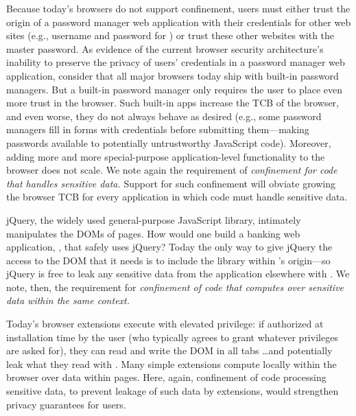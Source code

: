 %
%
Because today's browsers do not support confinement, users must either
trust the origin of a password manager web application with their
credentials for other web sites (e.g., username and password for
) or trust these other websites with the master
password.
%
As evidence of the current browser security architecture's inability
to preserve the privacy of users' credentials in a password manager
web application, consider that all major browsers today ship with
built-in password managers.
%
But a built-in password manager only requires the user to place even
more trust in the browser.
%
Such built-in apps increase the TCB of the browser, and even worse,
they do not always behave as desired (e.g., some password managers
fill in forms with credentials before submitting them---making
passwords available to potentially untrustworthy JavaScript code).
%
Moreover, adding more and more special-purpose application-level
functionality to the browser does not scale. We note again the
requirement of {\em confinement for code that handles sensitive data.}
Support for such confinement will obviate growing the browser TCB for
every application in which code must handle sensitive data.


jQuery, the widely used general-purpose JavaScript library, intimately
manipulates the DOMs of pages. How would one build a banking web
application, , that safely uses jQuery? Today the only
way to give jQuery the access to the DOM that it needs is to include
the library within 's origin---so jQuery is free to
leak any sensitive data from the application elsewhere with \xhr{}.
We note, then, the requirement for {\em confinement of code that
  computes over sensitive data within the same context.}

 Today's browser extensions execute with
elevated privilege: if authorized at installation time by the user
(who typically agrees to grant whatever privileges are asked for),
they can read and write the DOM in all tabs \ldots and potentially
leak what they read with \xhr{}. Many simple extensions compute
locally within the browser over data within pages. Here, again,
confinement of code processing sensitive data, to prevent leakage of
such data by extensions, would strengthen privacy guarantees for
users.

